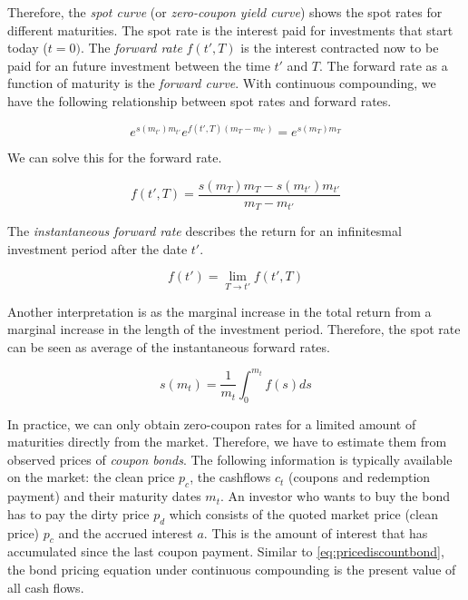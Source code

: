 Therefore, the \emph{spot curve} (or \emph{zero-coupon yield curve}) shows the spot rates for different maturities. The spot rate is the interest paid for investments that start today ($t=0)$. The \emph{forward rate} $f(t',T)$ is the interest contracted now to be paid for an future investment between the time $t'$ and $T$. The forward rate as a function of maturity is the \emph{forward curve}. With continuous compounding, we have the following relationship between spot rates and forward rates.

\begin{equation*}
  \label{eq:relspotforward}
  e^{s(m_{t'}) m_{t'}}e^{f(t',T)(m_T-m_{t'})} = e^{s(m_T) m_T}
\end{equation*}

We can solve this for the forward rate.

\begin{equation*}
  \label{eq:forwardrate}
  f(t',T) = \frac{s(m_T)m_T - s(m_{t'})m_{t'}}{m_T-m_{t'}}
\end{equation*}

The \emph{instantaneous forward rate} describes the return for an infinitesmal investment period after the date $t'$.

\begin{equation*}
  \label{eq:instforw}
  f(t') = \lim_{T\rightarrow t'}f(t',T)
\end{equation*}

Another interpretation is as the marginal increase in the total return from a marginal increase in the length of the investment period. Therefore, the spot rate can be seen as average of the instantaneous forward rates.

\begin{equation*}
  \label{eq:avgforwardrate}
  s(m_t)=\frac{1}{m_t}\int_0^{m_t}f(s)ds
\end{equation*}

In practice, we can only obtain zero-coupon rates for a limited amount of maturities directly from the market. Therefore, we have to estimate them from observed prices of \emph{coupon bonds}. The following information is typically available on the market: the clean price $p_c$, the cashflows $c_t$ (coupons and redemption payment) and their maturity dates $m_t$. An investor who wants to buy the bond has to pay the dirty price $p_d$ which consists of the quoted market price (clean price) $p_c$ and the accrued interest $a$. This is the amount of interest that has accumulated since the last coupon payment. Similar to \eqref{eq:pricediscountbond}, the bond pricing equation under continuous compounding is the present value of all cash flows.

